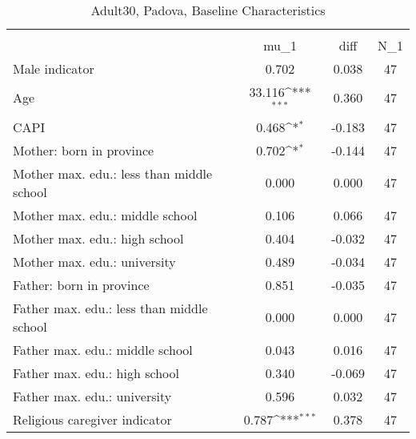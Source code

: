 \begin{table}[htbp]\centering
\def\sym#1{\ifmmode^{#1}\else\(^{#1}\)\fi}
\caption{Adult30, Padova, Baseline Characteristics}
\begin{tabular}{l*{1}{ccc}}
\toprule
                    &\multicolumn{3}{c}{}                           \\
                    &        mu\_1         &        diff&         N\_1\\
\midrule
Male indicator      &       0.702         &       0.038&          47\\
Age                 &      33.116\sym{***}&       0.360&          47\\
CAPI                &       0.468\sym{*}  &      -0.183&          47\\
Mother: born in province&       0.702\sym{*}  &      -0.144&          47\\
Mother max. edu.: less than middle school&       0.000         &       0.000&          47\\
Mother max. edu.: middle school&       0.106         &       0.066&          47\\
Mother max. edu.: high school&       0.404         &      -0.032&          47\\
Mother max. edu.: university&       0.489         &      -0.034&          47\\
Father: born in province&       0.851         &      -0.035&          47\\
Father max. edu.: less than middle school&       0.000         &       0.000&          47\\
Father max. edu.: middle school&       0.043         &       0.016&          47\\
Father max. edu.: high school&       0.340         &      -0.069&          47\\
Father max. edu.: university&       0.596         &       0.032&          47\\
Religious caregiver indicator&       0.787\sym{***}&       0.378&          47\\
\bottomrule
\end{tabular}
\end{table}
